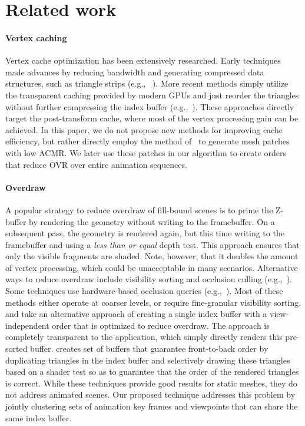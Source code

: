 \section{Related work}
\label{sec:prevwork}

\paragraph{Vertex caching}
Vertex cache optimization has been extensively researched.
Early techniques made advances by reducing bandwidth and generating compressed data structures, such as triangle strips (e.g., ~\cite{Akeley90, Deering95, Chow97}).
More recent methods simply utilize the transparent caching provided by modern GPUs and just reorder the triangles without
further compressing the index buffer (e.g.,~\cite{Hoppe99, Lin06, Sander07}). These approaches directly target the post-transform cache, where most of the vertex
processing gain can be achieved. In this paper, we do not propose new methods for improving cache efficiency, but rather directly employ the method of~\cite{Sander07} to generate mesh patches with low ACMR. We later use these patches in our algorithm 
to create orders that reduce OVR over entire animation sequences.

\paragraph{Overdraw}
 A popular strategy to reduce overdraw of fill-bound scenes is to prime the Z-buffer by rendering the geometry without writing to the framebuffer. On a subsequent pass, the geometry is rendered again, but this time writing to the framebuffer and using a {\em less than or equal} depth test. This approach ensures that only the visible fragments are shaded. Note, however, that it doubles the amount of vertex processing, which could be unacceptable in many scenarios. Alternative ways to reduce overdraw include visibility sorting and occlusion culling (e.g.,~\cite{Airey90, Teller91, Greene93}). Some techniques use hardware-based occlusion queries (e.g.,~\cite{Hillesland02, Bittner04, Govindaraju05}). Most of these methods either operate at coarser levels, or require fine-granular visibility sorting. \cite{Nehab06} and \cite{Sander07} take an alternative approach of creating a single index buffer with a view-independent order that is optimized to reduce overdraw. The approach is completely transparent to the application, which simply directly renders this pre-sorted buffer. \cite{Chen12} creates  set of buffers that guarantee front-to-back order by duplicating triangles in the index buffer and selectively drawing these triangles based on a shader test so as to guarantee that the order of the rendered triangles is correct. While these techniques provide good results for static meshes, they do not address animated scenes. Our proposed technique addresses this problem by jointly clustering sets of animation key frames and viewpoints that can share the same index buffer. 
